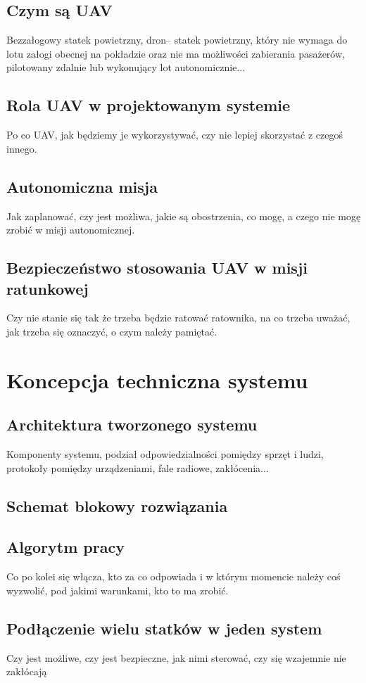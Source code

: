 \subsection{Czym są UAV}
Bezzałogowy statek powietrzny, dron– statek powietrzny, który nie wymaga do lotu załogi obecnej na pokładzie oraz nie ma możliwości zabierania pasażerów, pilotowany zdalnie lub wykonujący lot autonomicznie...
\subsection{Rola UAV w projektowanym systemie}
Po co UAV, jak będziemy je wykorzystywać, czy nie lepiej skorzystać z czegoś innego.
\subsection{Autonomiczna misja}
Jak zaplanować, czy jest możliwa, jakie są obostrzenia, co mogę, a czego nie mogę zrobić w misji autonomicznej.
\subsection{Bezpieczeństwo stosowania UAV w misji ratunkowej}
Czy nie stanie się tak że trzeba będzie ratować ratownika, na co trzeba uważać, jak trzeba się oznaczyć, o czym należy pamiętać.

\section{Koncepcja techniczna systemu}
\subsection{Architektura tworzonego systemu}
Komponenty systemu, podział odpowiedzialności pomiędzy sprzęt i ludzi, protokoły pomiędzy urządzeniami, fale radiowe, zakłócenia...
\subsection{Schemat blokowy rozwiązania}
\subsection{Algorytm pracy}
Co po kolei się włącza, kto za co odpowiada i w którym momencie należy coś wyzwolić, pod jakimi warunkami, kto to ma zrobić.
\subsection{Podłączenie wielu statków w jeden system}
Czy jest możliwe, czy jest bezpieczne, jak nimi sterować, czy się wzajemnie nie zakłócają
